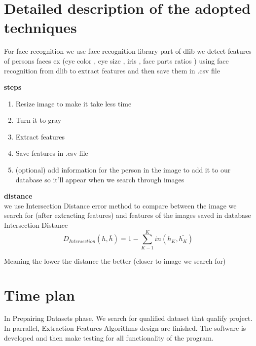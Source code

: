 \documentclass[pdftex,10pt,a4paper,oneside]{article}
\begin{document}
	
	\pagebreak
	\section{Detailed description of the adopted techniques }
	For face recognition we use face recognition library part of dlib
	we detect features of persons faces ex (eye color , eye size , iris , face parts ratios ) using face recognition from dlib to extract features and then save them in .csv file
	
	
	
	
		\textbf{{\large steps}}\\
		\begin{enumerate}
			\item Resize image to make it take less time
			
			
		
			
			
			
			\item Turn it to gray 
			\item Extract features
			\item Save features in .csv file
			\item (optional) add information for the person in the image to add it to our database so it’ll appear when we search through  images
			
		\end{enumerate}







	
	\textbf{{\large distance}}\\
	we use Intersection Distance error method to compare between the image we search for (after extracting features)  and features of the images saved in database\\
	Intersection Distance \\
	\begin{equation}
		D_{Intersection}(h,\bar{h})= 1- \sum_{K-1}^{K} in(h_{K},\bar{h_{K}})
	\end{equation}
	
	Meaning the lower the distance the better (closer to image we search for)
	\pagebreak

		
	\pagebreak
	\section{Time plan}
In Prepairing Datasets phase, We search for qualified dataset that qualify project.
In parrallel, Extraction Features Algorithms design are finished. The software is
developed and then make testing for all functionality of the
program.
\end{document}
